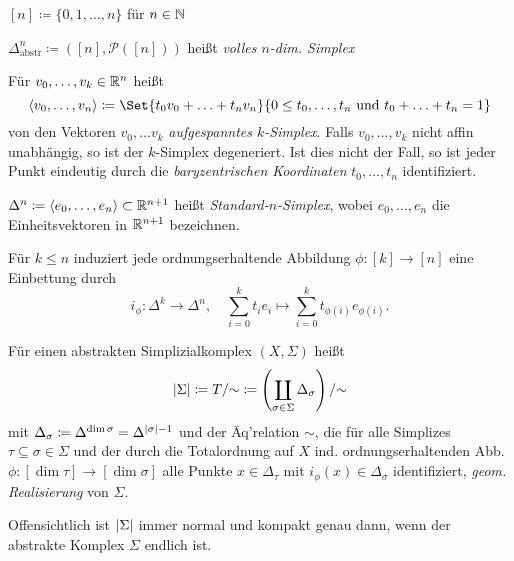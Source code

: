 \documentclass{cheat-sheet}
\begin{document}
\begin{nota}
  $[n] \coloneqq \{ 0, 1, \ldots, n \}$ für $n \in \mathbb{N}$
\end{nota}

\begin{defn}
  $\Delta^n_{\text{abstr}} \coloneqq ([n], \mathcal{P}([n]))$ heißt \emph{volles $n$-dim. Simplex}
\end{defn}

\begin{defn}
  Für $v_0, \ldots, v_k \in \mathbb{R}^n$ heißt
  \[ \langle v_0, \ldots, v_n \rangle \coloneqq \Set{ t_0 v_0 + \ldots + t_n v_n }{ 0 \leq t_0, \ldots, t_n \text{ und } t_0 + \ldots + t_n = 1 } \]
  von den Vektoren $v_0, \ldots v_k$ \emph{aufgespanntes $k$-Simplex}. Falls $v_0, \ldots, v_k$ nicht affin unabhängig, so ist der $k$-Simplex degeneriert. Ist dies nicht der Fall, so ist jeder Punkt eindeutig durch die \emph{baryzentrischen Koordinaten} $t_0, \ldots, t_n$ identifiziert.
\end{defn}

\begin{defn}
  $\Delta^n \coloneqq \langle e_0, \ldots, e_n \rangle \subset \mathbb{R}^{n+1}$ heißt \emph{Standard-$n$-Simplex}, wobei $e_0, \ldots, e_n$ die Einheitsvektoren in $\mathbb{R}^{n+1}$ bezeichnen.
\end{defn}

\begin{bem}
  Für $k \leq n$ induziert jede ordnungserhaltende Abbildung $\phi : [k] \to [n]$ eine Einbettung durch
  \[ i_\phi : \Delta^k \to \Delta^n, \quad \sum_{i=0}^k t_i e_i \mapsto \sum_{i=0}^k t_{\phi(i)} e_{\phi(i)}. \]
\end{bem}

\begin{defn}
  Für einen abstrakten Simplizialkomplex $(X, \Sigma)$ heißt
  \[ \lvert\Sigma\rvert \coloneqq T / {\sim} \coloneqq \left( \coprod_{\sigma \in \Sigma} \Delta_\sigma \right) / {\sim} \]
  mit $\Delta_\sigma \coloneqq \Delta^{\dim \sigma} = \Delta^{\lvert\sigma\rvert - 1}$ und der Äq'relation ${\sim}$, die für alle Simplizes $\tau \subseteq \sigma \in \Sigma$ und der durch die Totalordnung auf $X$ ind. ordnungserhaltenden Abb. $\phi : [ \dim \tau ] \to [ \dim \sigma ]$ alle Punkte $x \in \Delta_\tau$ mit $i_\phi(x) \in \Delta_{\sigma}$ identifiziert, \emph{geom. Realisierung} von $\Sigma$.
\end{defn}

\begin{bem}
  Offensichtlich ist $\lvert\Sigma\rvert$ immer normal und kompakt genau dann, wenn der abstrakte Komplex $\Sigma$ endlich ist.
\end{bem}
\end{document}
